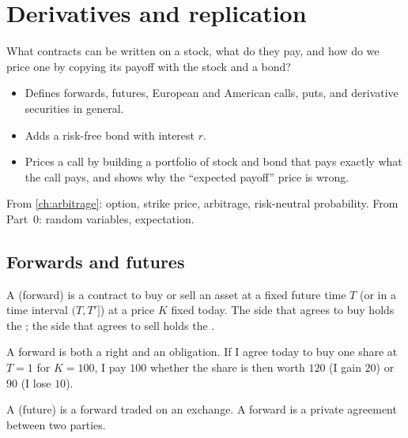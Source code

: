 \chapter{Derivatives and replication}
\label{ch:derivatives}

\begin{question}
What contracts can be written on a stock, what do they pay, and how do we price one by copying its payoff with the stock and a bond?
\end{question}

\begin{whatfor}
\begin{itemize}
  \item Defines forwards, futures, European and American calls, puts, and derivative securities in general.
  \item Adds a risk-free bond with interest $r$.
  \item Prices a call by building a portfolio of stock and bond that pays exactly what the call pays, and shows why the ``expected payoff'' price is wrong.
\end{itemize}
\end{whatfor}

\begin{prereq}
From \cref{ch:arbitrage}: option, strike price, arbitrage, risk-neutral probability. From Part~0: random variables, expectation.
\end{prereq}

\section{Forwards and futures}

\begin{definition}
A  (forward) is a contract to buy or sell an asset at a fixed future time $T$ (or in a time interval $(T,T']$) at a price $K$ fixed today. The side that agrees to buy holds the ; the side that agrees to sell holds the .
\end{definition}

A forward is both a right and an obligation. If I agree today to buy one share at $T=1$ for $K=100$, I pay $100$ whether the share is then worth $120$ (I gain $20$) or $90$ (I lose $10$).

\begin{definition}
A  (future) is a forward traded on an exchange. A forward is a private agreement between two parties.
\end{definition}

